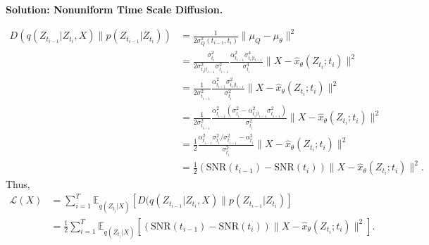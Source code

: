 \documentclass[12pt]{article}
\newcommand{\field}[1]{\mathbb{#1}}
\begin{document}
\begin{enumerate}
\begin{solution}{\bf Solution: Nonuniform Time Scale Diffusion.}
\begin{enumerate}
    \[
    \begin{aligned}
        D(q(Z_{t_{i-1}}|Z_{t_i}, X)\| p(Z_{t_{i-1}}|Z_{t_i}))&=\frac{1}{2\sigma^2_Q(t_{i-1},t_i)}\|\mu_Q-\mu_{\theta}\|^2\\
        &=\frac{\sigma_{t_i}^2}{2\sigma^2_{t_i|t_{i-1}}\sigma^2_{t_{i-1}}}\frac{\alpha^2_{t_{i-1}}\sigma_{t_i|t_{i-1}}^4}{\sigma_{t_i}^4}\|X-\hat{x}_\theta(Z_{t_i};t_i)\|^2\\&=\frac{1}{2\sigma^2_{t_{i-1}}}\frac{\alpha^2_{t_{i-1}}\sigma_{t_i|t_{i-1}}^2}{\sigma^2_{t_i}}\|X-\hat{x}_\theta(Z_{t_i};t_i)\|^2\\&=\frac{1}{2\sigma^2_{t_{i-1}}}\frac{\alpha^2_{t_{i-1}}(\sigma_{t_i}^2-\alpha^2_{t_i|t_{i-1}}\sigma^2_{t_{i-1}})}{\sigma^2_{t_i}}\|X-\hat{x}_\theta(Z_{t_i};t_i)\|^2\\&=\frac{1}{2}\frac{\alpha^2_{t_{i-1}}\sigma_{t_i}^2/\sigma^2_{t_{i-1}}-\alpha^2_{t_i}}{\sigma^2_{t_i}}\|X-\hat{x}_\theta(Z_{t_i};t_i)\|^2\\&=\frac12\left(\text{SNR}(t_{i-1})-\text{SNR}(t_i)\right)\|X-\hat{x}_\theta(Z_{t_i};t_i)\|^2.
    \end{aligned} \]
    Thus,
    \[
    \begin{aligned}\mathcal{L}(X) &=  \sum_{i=1}^T \field{E}_{q(Z_{t_i}|X)}[D(q(Z_{t_{i-1}}|Z_{t_i}, X)\| p(Z_{t_{i-1}}|Z_{t_i})]\\&=\frac12\sum_{i=1}^T\field{E}_{q(Z_{t_i}|X)}\left[\left(\text{SNR}(t_{i-1})-\text{SNR}(t_i)\right)\|X-\hat{x}_\theta(Z_{t_i};t_i)\|^2\right].
    \end{aligned}
    \]
\end{enumerate}
\end{solution}



\begin{problem}
    \newpage~\newpage
\end{problem}


\end{enumerate}
\end{document}
